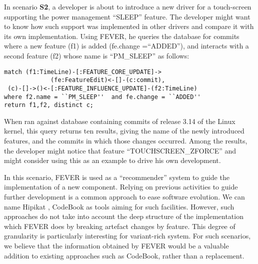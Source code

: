 In scenario \textbf{S2}, a developer is about to introduce a new driver for a touch-screen 
supporting the power management ``SLEEP'' feature.
The developer might want to know how such support was implemented in other drivers and compare it with its own implementation.
Using FEVER, he queries the database for commits where a new feature (f1) is added (fe.change =``ADDED''),
and interacts with a second feature (f2) whose name is ``PM\_\-SLEEP'' as follows:
\vspace{-.5ex}
\begin{verbatim}
match (f1:TimeLine)-[:FEATURE_CORE_UPDATE]->
             (fe:FeatureEdit)<-[]-(c:commit),
 (c)-[]->()<-[:FEATURE_INFLUENCE_UPDATE]-(f2:TimeLine)    
where f2.name = ``PM_SLEEP''  and fe.change = ``ADDED''
return f1,f2, distinct c;
\end{verbatim}
\vspace{-.5ex}

When ran against database containing commits of release 3.14 of the Linux kernel, this query returns ten results, giving the name of the
newly introduced features, and the commits in which those changes occurred.
Among the results, the developer might notice that feature ``TOUCHSCREEN\_ZFORCE''
and might consider using this as an example to drive his own development.

In this scenario, FEVER is used as a ``recommender'' system to guide the implementation of a new component.
Relying on previous activities to guide further development is a common approach to ease software evolution.
We can name Hipikat \citep{cubranic_hipikat:_2003}, CodeBook \citep{begel_codebook:_2010} as tools aiming for such facilities.
However, such approaches do not take into account the deep structure of the implementation
which FEVER does by breaking artefact changes by feature.
This degree of granularity is particularly interesting for variant-rich system.
For such scenarios, we believe that the information obtained by FEVER would be a valuable addition to existing approaches such as CodeBook,
rather than a replacement.


